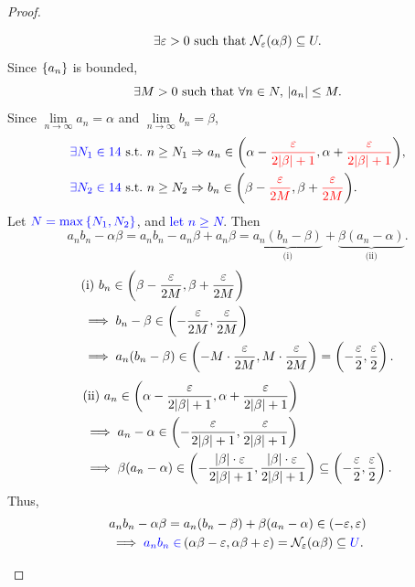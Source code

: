 \documentclass[11pt,openany]{article}
\begin{document}
\begin{note}[]
\begin{proof}
\begin{flushleft}
\begin{minipage}[t]{0.495\textwidth}
\begin{enumerate}
\[	\exists\varepsilon>0\ \text{such that}\ \mathcal{N}_{\varepsilon}(\alpha\beta)\subseteq U.
	\] Since $\set{a_n}$ is bounded, \[
	\exists M>0\ \text{such that}\ \forall n\in N,\ \abs{a_n}\leq M.
	\] Since $\lim\limits_{n\to\infty}a_n=\alpha$ and $\lim\limits_{n\to\infty}b_n=\beta$, \begin{align*}
		&\textcolor{blue}{\exists N_1\in\N}\ \text{s.t.}\ n\geq N_1\Rightarrow a_n\in {\intoo{\alpha-\textcolor{red}{\frac{\varepsilon}{2\abs{\beta}+1}},\alpha+\textcolor{red}{\frac{\varepsilon}{2\abs{\beta}+1}}}},\\
		&\textcolor{blue}{\exists N_2\in\N}\ \text{s.t.}\ n\geq N_2\Rightarrow b_n\in {\intoo{\beta-\textcolor{red}{\frac{\varepsilon}{2M}},\beta+\textcolor{red}{\frac{\varepsilon}{2M}}}}.
	\end{align*} Let $\textcolor{blue}{N=\max\set{N_1,N_2}}$, and \textcolor{blue}{let $n\geq N$}. Then \[
	a_nb_n-\alpha\beta=a_nb_n-a_n\beta+a_n\beta=\underbrace{a_n(b_n-\beta)}_{\text{(i)}}+\underbrace{\beta(a_n-\alpha)}_{\text{(ii)}}.
	\]\begin{align*}
		&\text{(i)}\ b_n\in\intoo{\beta-\frac{\varepsilon}{2M},\beta+\frac{\varepsilon}{2M}}\\&\implies b_n-\beta\in\intoo{-\frac{\varepsilon}{2M},\frac{\varepsilon}{2M}}\\
		&\implies a_n(b_n-\beta)\in\intoo{-M\cdot\frac{\varepsilon}{2M}, M\cdot\frac{\varepsilon}{2M}}=\intoo{-\frac{\varepsilon}{2},\frac{\varepsilon}{2}}.
	\end{align*}
	\begin{align*}
		&\text{(ii)}\ a_n\in\intoo{\alpha-\frac{\varepsilon}{2\abs{\beta}+1},\alpha+\frac{\varepsilon}{2\abs{\beta}+1}}\\&\implies a_n-\alpha\in\intoo{-\frac{\varepsilon}{2\abs{\beta}+1},\frac{\varepsilon}{2\abs{\beta}+1}}\\
		&\implies \beta(a_n-\alpha)\in\intoo{-\frac{\abs{\beta}\cdot\varepsilon}{2\abs{\beta}+1},\frac{\abs{\beta}\cdot\varepsilon}{2\abs{\beta}+1}}\subseteq\intoo{-\frac{\varepsilon}{2},\frac{\varepsilon}{2}}.
	\end{align*}
	Thus, \begin{align*}
		&a_nb_n-\alpha\beta=a_n(b_n-\beta)+\beta(a_n-\alpha)\in\intoo{-\varepsilon,\varepsilon}\\
		&\implies \textcolor{blue}{a_nb_n\in}\intoo{\alpha\beta-\varepsilon,\alpha\beta+\varepsilon}=\nbhd_{\varepsilon}(\alpha\beta)\subseteq \textcolor{blue}{U}.
	\end{align*}
\end{enumerate}

\end{minipage}
\end{flushleft}
\end{proof}
\end{note}
\end{document}
